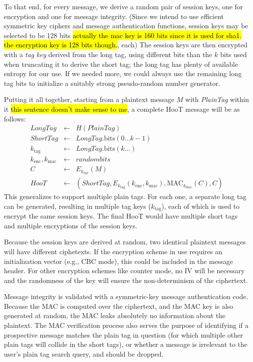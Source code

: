 To that end, for every message, we derive a random pair of session keys, one for encryption and one for message integrity. (Since we intend to use efficient symmetric key ciphers and message authentication functions, session keys may be selected to be 128 bits \hl{actually the mac key is 160 bits since it is used for sha1. the encryption key is 128 bits though.}, each) The session keys are then encrypted with a {\em tag key} derived from the long tag, using different bits than the $k$ bits used when truncating it to derive the short tag; the long tag has plenty of available entropy for our use. If we needed more, we could always use the remaining long tag bits to initialize a suitably strong pseudo-random number generator.

Putting it all together, starting from a plaintext message $M$ with {\em PlainTag} within it \hl{this sentence doesn't make sense to me}, a complete HooT message will be as follows:
%
\begin{eqnarray*}
\mathit{LongTag} & \leftarrow & H(\mathit{PlainTag}) \\
\mathit{ShortTag} & \leftarrow & \mathit{LongTag}.\mathrm{bits}(0 \ldots k-1) \\
k_{\mathrm{tag}} & \leftarrow & \mathit{LongTag}.\mathrm{bits}(k \ldots) \\
k_{\mathrm{enc}}, k_{\mathrm{mac}} & \leftarrow & \mathit{random bits} \\
C & \leftarrow & E_{k_{\mathrm{enc}}}(M) \\
\mathit{HooT}  & \leftarrow &  \left(\mathit{ShortTag}, E_{k_{\mathrm{tag}}} \left(k_{\mathrm{enc}}, k_{\mathrm{mac}}\right), \mathrm{MAC}_{k_{\mathrm{mac}}}(C), C\right)
\end{eqnarray*}
%
This generalizes to support multiple plain tags. For each one, a separate long tag can be generated, resulting in multiple tag keys ($k_\mathrm{tag}$), each of which is used to encrypt the same session keys. The final HooT would have multiple short tags and multiple encryptions of the session keys.

Because the session keys are derived at random, two identical plaintext messages will have different ciphetexts. If the encryption scheme in use requires an initialization vector (e.g., CBC mode), this could be included in the message header. For other encryption schemes like counter mode, no IV will be necessary and the randomness of the key will ensure the non-determinism of the ciphertext.

Message integrity is validated with a symmetric-key message authentication code. Because the MAC is computed over the ciphertext, and the MAC key is also generated at random, the MAC leaks absolutely no information about the plaintext. The MAC verification process also serves the purpose of identifying if a prospective message matches the plain tag in question (for which multiple other plain tags will collide in the short tags), or whether a message is irrelevant to the user's plain tag search query, and should be dropped.

